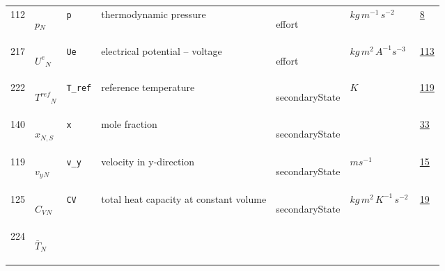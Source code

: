 \begin{longtable}{|p{1cm}|p{2.5cm}|p{4.5cm}|p{8cm}|p{3.0cm}|p{3cm}|p{1cm}|}
                 \\
            112
             & \hypertarget{"v:112"}{ $ {p}{_{N}} $}
             & \verb|p|
             & thermodynamic pressure
             & \begin{lay}effort \end{lay}
             & $ kg \,m^{-1} \,s^{-2} \, $
             &                 \hyperlink{"e:8"}{ 8 }
                 \\
            217
             & \hypertarget{"v:217"}{ $ {{U^e}}{_{N}} $}
             & \verb|Ue|
             & electrical potential -- voltage
             & \begin{lay}effort \end{lay}
             & $ kg \,m^{2} \,A^{-1} s^{-3} \, $
             &                 \hyperlink{"e:113"}{ 113 }
                 \\
            222
             & \hypertarget{"v:222"}{ $ {{T^{ref}}}{_{N}} $}
             & \verb|T_ref|
             & reference temperature
             & \begin{lay}secondaryState \end{lay}
             & $ K \, $
             &                 \hyperlink{"e:119"}{ 119 }
                 \\
            140
             & \hypertarget{"v:140"}{ $ {x}{_{N, S}} $}
             & \verb|x|
             & mole fraction
             & \begin{lay}secondaryState \end{lay}
             & $  $
             &                 \hyperlink{"e:33"}{ 33 }
                 \\
            119
             & \hypertarget{"v:119"}{ $ {{v_y}}{_{N}} $}
             & \verb|v_y|
             & velocity in y-direction
             & \begin{lay}secondaryState \end{lay}
             & $ m s^{-1} \, $
             &                 \hyperlink{"e:15"}{ 15 }
                 \\
            125
             & \hypertarget{"v:125"}{ $ {{C_V}}{_{N}} $}
             & \verb|CV|
             & total heat capacity at constant volume
             & \begin{lay}secondaryState \end{lay}
             & $ kg \,m^{2} \,K^{-1} \,s^{-2} \, $
             &                 \hyperlink{"e:19"}{ 19 }
                 \\
            224
             & \hypertarget{"v:224"}{ $ {{\bar{T}}}{_{N}} $}

\end{longtable}

